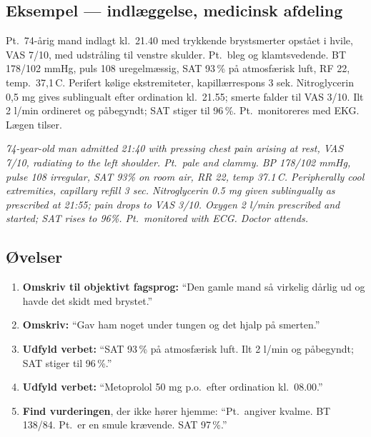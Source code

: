 \documentclass[11pt,a4paper]{report}
\newcommand{\eng}[1]{\textcolor{en}{\itshape #1}}       %
\begin{document}
\subsection{Eksempel --- indlæggelse, medicinsk afdeling}
\begin{notebox}
Pt.\ 74-årig mand indlagt kl.\ 21.40 med trykkende brystsmerter opstået i hvile, VAS 7/10,
med udstråling til venstre skulder. Pt.\ bleg og klamtsvedende. BT 178/102 mmHg, puls 108
uregelmæssig, SAT 93\,\% på atmosfærisk luft, RF 22, temp.\ 37,1\,\textdegree C. Perifert kølige
ekstremiteter, kapillærrespons 3 sek. Nitroglycerin 0,5 mg gives sublingualt efter ordination
kl.\ 21.55; smerte falder til VAS 3/10. Ilt 2 l/min ordineret og påbegyndt; SAT stiger til
96\,\%. Pt.\ monitoreres med EKG. Lægen tilser.

\medskip
{\color{muted}\small\eng{74-year-old man admitted 21:40 with pressing chest pain arising at rest, VAS 7/10,
radiating to the left shoulder. Pt.\ pale and clammy. BP 178/102 mmHg, pulse 108 irregular,
SAT 93\% on room air, RR 22, temp 37.1\,\textdegree C. Peripherally cool extremities, capillary
refill 3 sec. Nitroglycerin 0.5 mg given sublingually as prescribed at 21:55; pain drops to
VAS 3/10. Oxygen 2 l/min prescribed and started; SAT rises to 96\%. Pt.\ monitored with ECG.
Doctor attends.}}
\end{notebox}

\subsection{Øvelser}
\begin{enumerate}[leftmargin=1.5em,itemsep=8pt]
\item \textbf{Omskriv til objektivt fagsprog:} ``Den gamle mand så virkelig dårlig ud og havde det skidt med brystet.''
\item \textbf{Omskriv:} ``Gav ham noget under tungen og det hjalp på smerten.''
\item \textbf{Udfyld verbet:} ``SAT 93\,\% på atmosfærisk luft. Ilt 2 l/min \underline{\hspace{2.5cm}} og påbegyndt; SAT stiger til 96\,\%.''
\item \textbf{Udfyld verbet:} ``Metoprolol 50 mg \underline{\hspace{2.5cm}} p.o.\ efter ordination kl.\ 08.00.''
\item \textbf{Find vurderingen}, der ikke hører hjemme: ``Pt.\ angiver kvalme. BT 138/84. Pt.\ er en smule krævende. SAT 97\,\%.''
\end{enumerate}
\end{document}
